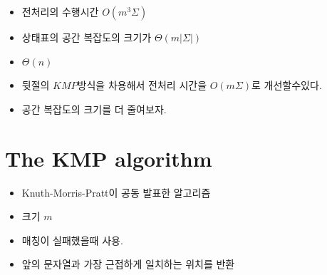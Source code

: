 \begin{frame}
    \begin{itemize}
        \item 전처리의 수행시간 $O(m^3 \Sigma)$
        \item 상태표의 공간 복잡도의 크기가 $\Theta(m|\Sigma|)$
        \item $\Theta(n)$
    \end{itemize}
\end{frame}

\begin{frame}
    \begin{itemize}
        \item 뒷절의 $KMP$방식을 차용해서 전처리 시간을 $O(m \Sigma)$로 개선할수있다.
        \item 공간 복잡도의 크기를 더 줄여보자.    
    \end{itemize}
\end{frame}



\section{The KMP algorithm}

\begin{frame}[KMP?]
    \begin{itemize}
        \item Knuth-Morris-Pratt이 공동 발표한 알고리즘
    \end{itemize}
\end{frame}

\begin{frame}[$\delta$대신 $\pi$]
    \begin{itemize}
        \item 크기 $m$
        \item 매칭이 실패했을때 사용.
        \item 앞의 문자열과 가장 근접하게 일치하는 위치를 반환
    \end{itemize}
\end{frame}

